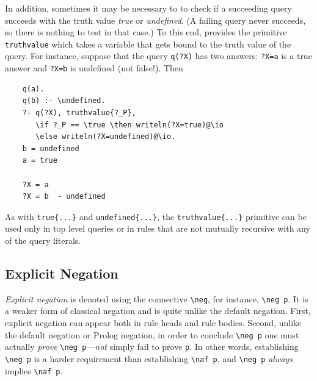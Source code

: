 \documentclass[11pt]{article}
\newcommand{\ERGO}{\mbox{\smaller{\ensuremath{\cal{E}}\smaller{{\sc{RGO}}}}}\xspace}
\newcommand{\FLSYSTEM}{\ERGO}
\newcommand{\bs}{\textbackslash}
\newcommand{\RULELOGNAF}{{\texttt{{\bs}naf}}\xspace}
\newcommand{\RULELOGNEG}{{\texttt{{\bs}neg}}\xspace}
\begin{document}
In addition, sometimes it may be necessary to to check if a succeeding
query succeeds with the truth value \emph{true} or
\emph{undefined}. (A failing query never succeeds, so there is nothing to
test in that case.)  To this end, \FLSYSTEM provides the primitive
\texttt{truthvalue} which takes a variable that gets bound to the truth
value of the query. For instance, suppose that the query \texttt{q(?X)} has
two answers: \texttt{?X=a} is a true answer and \texttt{?X=b} is undefined
(not false!). Then
\begin{verbatim}
    q(a).
    q(b) :- \undefined.
    ?- q(?X), truthvalue{?_P},
       \if ?_P == \true \then writeln(?X=true)@\io
       \else writeln(?X=undefined)@\io.
    b = undefined
    a = true

    ?X = a
    ?X = b  - undefined
\end{verbatim}
As with {\tt true\{...\}}  and {\tt undefined\{...\}}, the
\texttt{truthvalue\{...\}} primitive can be used only in top level queries or
in rules that are not mutually recursive with any of the query literals.

\subsection{Explicit Negation}
\label{sec-explicit-negation}

\emph{Explicit negation} is denoted using the connective {\tt \RULELOGNEG}, for
instance, {\tt \RULELOGNEG p}. It is a weaker form of classical negation and is
quite unlike the default negation. First, explicit negation can appear both
in rule heads and rule bodies. Second, unlike the default negation or
Prolog negation, in order to conclude {\tt \RULELOGNEG p} one must actually
\emph{prove} {\tt \RULELOGNEG p}---\emph{not} simply
fail to prove {\tt p}. In other words, establishing \texttt{\RULELOGNEG p}
is a harder requirement than establishing \texttt{\RULELOGNAF p},
and \texttt{\RULELOGNEG p} \emph{always} implies   \texttt{\RULELOGNAF p}.
\end{document}
